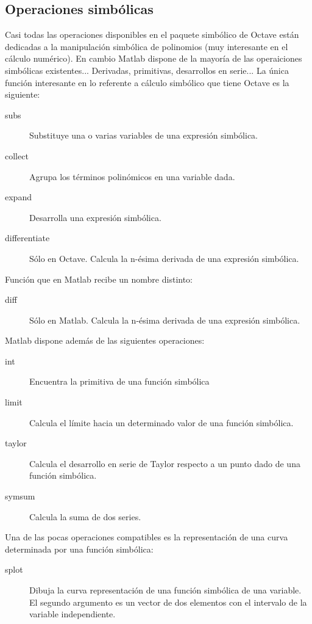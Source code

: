 \subsection{Operaciones simbólicas}

Casi todas las operaciones disponibles en el paquete simbólico de
Octave están dedicadas a la manipulación simbólica de polinomios (muy
interesante en el cálculo numérico). En cambio Matlab dispone de la
mayoría de las operaiciones simbólicas existentes... Derivadas, primitivas,
desarrollos en serie... La única función interesante en lo referente
a cálculo simbólico que tiene Octave es la siguiente:

\begin{description}
\item [subs]Substituye una o varias variables de una expresión
simbólica.
\item [collect]Agrupa los términos polinómicos en una variable
dada.
\item [expand]Desarrolla una expresión simbólica.
\item [differentiate]Sólo en Octave. Calcula la n-ésima
derivada de una expresión simbólica.
\end{description}
Función que en Matlab recibe un nombre distinto:

\begin{description}
\item [diff]Sólo en Matlab. Calcula la n-ésima derivada de
una expresión simbólica.
\end{description}
Matlab dispone además de las siguientes operaciones:

\begin{description}
\item [int]Encuentra la primitiva de una función simbólica
\item [limit]Calcula el límite hacia un determinado valor
de una función simbólica.
\item [taylor]Calcula el desarrollo en serie de Taylor respecto
a un punto dado de una función simbólica.
\item [symsum]Calcula la suma de dos series.
\end{description}
Una de las pocas operaciones compatibles es la representación de una
curva determinada por una función simbólica:

\begin{description}
\item [splot]Dibuja la curva representación de una función
simbólica de una variable. El segundo argumento es un vector de dos
elementos con el intervalo de la variable independiente.
\end{description}
  \begin{verbatim}

 \end{verbatim}
